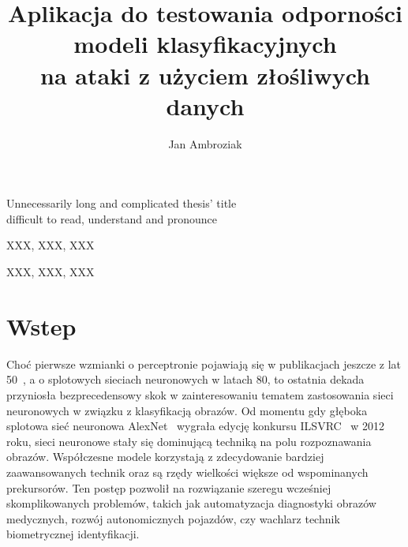 \documentclass[
    left=2.5cm,         %
    right=2.5cm,        %
    top=2.5cm,          %
    bottom=3cm,         %
    bindingoffset=6mm,  %
    nohyphenation=false %
]{eiti/eiti-thesis}
\begin{document}
\EngineerThesis %
{}
\title
{
    Aplikacja do testowania odporności modeli klasyfikacyjnych \\
    na ataki z użyciem złośliwych danych \\
}

\engtitle
{ %
    Unnecessarily long and complicated thesis' title \\
    difficult to read, understand and pronounce
}

\author{Jan Ambroziak}
\date{\the\year}
\maketitle

\cleardoublepage %
\streszczenie \lipsum[1-3]
\slowakluczowe XXX, XXX, XXX

\newpage
\abstract \kant[1-3]
\keywords XXX, XXX, XXX

\cleardoublepage  %
\pagestyle{plain}
\makeauthorship

\cleardoublepage %
\tableofcontents

\cleardoublepage %
\pagestyle{headings}

\section{Wstep}
Choć pierwsze wzmianki o perceptronie pojawiają się w publikacjach jeszcze z lat 50~\cite{TIBKAT:271027045},
a o splotowych sieciach neuronowych w latach 80\cite{doi:10.1162/neco.1989.1.4.541}, to ostatnia dekada przyniosła bezprecedensowy skok w zainteresowaniu
tematem zastosowania sieci neuronowych w związku z klasyfikacją obrazów.
Od momentu gdy głęboka splotowa sieć neuronowa AlexNet~\cite{NIPS2012_4824} wygrała edycję konkursu ILSVRC~\cite{ILSVRC15} w 2012 roku, sieci neuronowe stały się
dominującą techniką na polu rozpoznawania obrazów.
Współczesne modele korzystają z zdecydowanie bardziej zaawansowanych technik oraz są rzędy wielkości większe
od wspominanych prekursorów.
Ten postęp pozwolił na rozwiązanie szeregu wcześniej skomplikowanych problemów, takich jak automatyzacja diagnostyki obrazów medycznych,
rozwój autonomicznych pojazdów, czy wachlarz technik biometrycznej identyfikacji.
\end{document}
